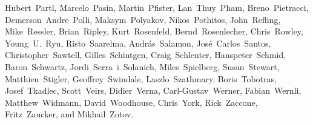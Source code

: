 \begin{flushleft}
Hubert~Partl,           %
Marcelo~Pasin,          %
Martin~Pfister,		%
Lan~Thuy~Pham,          %
Breno~Pietracci,        %
Demerson~Andre~Polli,   %
Maksym~Polyakov,        %
Nikos~Pothitos,		%
John~Refling,           %
Mike~Ressler,           %
Brian~Ripley,           %
Kurt~Rosenfeld,		%
Bernd~Rosenlecher,      %
Chris~Rowley,           %
Young~U.~Ryu,           %
Risto~Saarelma,         %
Andr{\'a}s~Salamon,     %
Jos\'e~Carlos~Santos,   %
Christopher~Sawtell,    %
Gilles~Schintgen,       %
Craig~Schlenter,        %
Hanspeter~Schmid,       %
Baron~Schwartz,         %
Jordi~Serra~i~Solanich, %
Miles~Spielberg,        %
Susan~Stewart,
Matthieu~Stigler,
Geoffrey~Swindale,      %
Laszlo~Szathmary,       %
Boris~Tobotras,         %
Josef~Tkadlec,          %
Scott~Veirs,            %
Didier~Verna,           %
Carl-Gustav~Werner,     %
Fabian~Wernli,          %
Matthew~Widmann,        %
David~Woodhouse,        %
Chris~York,             %
Rick~Zaccone,           %
Fritz~Zaucker,          %
and Mikhail~Zotov.      %
\end{flushleft}

\endinput